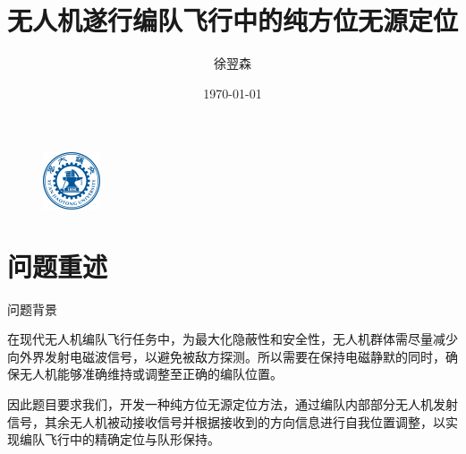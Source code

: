 \documentclass[aspectratio=169]{beamer}
\title{无人机遂行编队飞行中的纯方位无源定位}
\author{徐翌森}
\institute{软件2204}
\date{\today}
\begin{document}
\begin{frame}
    \titlepage
    \begin{figure}[h]
        \centering
        \includegraphics[width=0.15\textwidth]{xjtu/XJUT_Logo.png}
    \end{figure}
\end{frame}


\section{问题重述}
\begin{frame}{问题背景}

在现代无人机编队飞行任务中，为最大化隐蔽性和安全性，无人机群体需尽量减少向外界发射电磁波信号，以避免被敌方探测。所以需要在保持电磁静默的同时，确保无人机能够准确维持或调整至正确的编队位置。

因此题目要求我们，开发一种纯方位无源定位方法，通过编队内部部分无人机发射信号，其余无人机被动接收信号并根据接收到的方向信息进行自我位置调整，以实现编队飞行中的精确定位与队形保持。
\end{frame}
\end{document}
